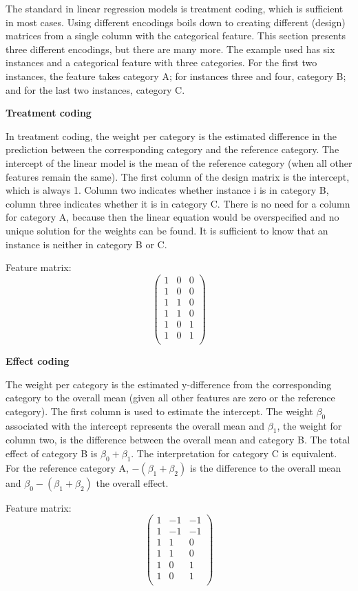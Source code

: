 \documentclass[12pt,]{krantz}
\begin{document}
The standard in linear regression models is treatment coding, which is
sufficient in most cases. Using different encodings boils down to
creating different (design) matrices from a single column with the
categorical feature. This section presents three different encodings,
but there are many more. The example used has six instances and a
categorical feature with three categories. For the first two instances,
the feature takes category A; for instances three and four, category B;
and for the last two instances, category C.

\textbf{Treatment coding}

In treatment coding, the weight per category is the estimated difference
in the prediction between the corresponding category and the reference
category. The intercept of the linear model is the mean of the reference
category (when all other features remain the same). The first column of
the design matrix is the intercept, which is always 1. Column two
indicates whether instance i is in category B, column three indicates
whether it is in category C. There is no need for a column for category
A, because then the linear equation would be overspecified and no unique
solution for the weights can be found. It is sufficient to know that an
instance is neither in category B or C.

Feature matrix:
\[\begin{pmatrix}1&0&0\\1&0&0\\1&1&0\\1&1&0\\1&0&1\\1&0&1\\\end{pmatrix}\]

\textbf{Effect coding}

The weight per category is the estimated y-difference from the
corresponding category to the overall mean (given all other features are
zero or the reference category). The first column is used to estimate
the intercept. The weight \(\beta_{0}\) associated with the intercept
represents the overall mean and \(\beta_{1}\), the weight for column
two, is the difference between the overall mean and category B. The
total effect of category B is \(\beta_{0}+\beta_{1}\). The
interpretation for category C is equivalent. For the reference category
A, \(-(\beta_{1}+\beta_{2})\) is the difference to the overall mean and
\(\beta_{0}-(\beta_{1}+\beta_{2})\) the overall effect.

Feature matrix:
\[\begin{pmatrix}1&-1&-1\\1&-1&-1\\1&1&0\\1&1&0\\1&0&1\\1&0&1\\\end{pmatrix}\]
\end{document}
